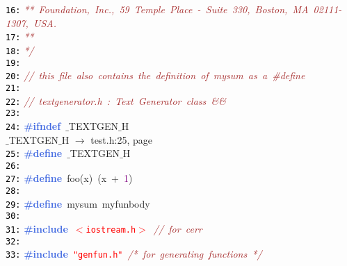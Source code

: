 \documentclass{article}
\begin{document}
\mbox{}\texttt{\textcolor{Black}{16:}} \textit{\textcolor{Brown}{**\ Foundation,\ Inc.,\ 59\ Temple\ Place\ -\ Suite\ 330,\ Boston,\ MA\ 02111-1307,\ USA.}} \\
\mbox{}\texttt{\textcolor{Black}{17:}} \textit{\textcolor{Brown}{**\ \ }} \\
\mbox{}\texttt{\textcolor{Black}{18:}} \textit{\textcolor{Brown}{*/}} \\
\mbox{}\texttt{\textcolor{Black}{19:}}  \\
\mbox{}\texttt{\textcolor{Black}{20:}} \textit{\textcolor{Brown}{//\ this\ file\ also\ contains\ the\ definition\ of\ mysum\ as\ a\ \#define}} \\
\mbox{}\texttt{\textcolor{Black}{21:}}  \\
\mbox{}\texttt{\textcolor{Black}{22:}} \textit{\textcolor{Brown}{//\ textgenerator.h\ :\ Text\ Generator\ class\ \&\&}} \\
\mbox{}\texttt{\textcolor{Black}{23:}}  \\
\mbox{}\texttt{\textcolor{Black}{24:}} \textbf{\textcolor{RoyalBlue}{\#ifndef}}\ $\_$TEXTGEN$\_$H \\
\mbox{}{\hfill $\_$TEXTGEN$\_$H $\rightarrow$ test.h:25, page~\pageref{test.h:25}} \\
\mbox{}\texttt{\textcolor{Black}{25:}} \textbf{\textcolor{RoyalBlue}{\#define}}\ \label{test.h:25}$\_$TEXTGEN$\_$H \\
\mbox{}\texttt{\textcolor{Black}{26:}}  \\
\mbox{}\texttt{\textcolor{Black}{27:}} \textbf{\textcolor{RoyalBlue}{\#define}}\ \label{test.h:27}foo\textcolor{BrickRed}{(}x\textcolor{BrickRed}{)}\ \textcolor{BrickRed}{(}x\ \textcolor{BrickRed}{+}\ \textcolor{Purple}{1}\textcolor{BrickRed}{)} \\
\mbox{}\texttt{\textcolor{Black}{28:}}  \\
\mbox{}\texttt{\textcolor{Black}{29:}} \textbf{\textcolor{RoyalBlue}{\#define}}\ \label{test.h:29}mysum\ myfunbody\  \\
\mbox{}\texttt{\textcolor{Black}{30:}}  \\
\mbox{}\texttt{\textcolor{Black}{31:}} \textbf{\textcolor{RoyalBlue}{\#include}}\ \texttt{\textcolor{Red}{$<$iostream.h$>$}}\ \textit{\textcolor{Brown}{//\ for\ cerr}} \\
\mbox{}\texttt{\textcolor{Black}{32:}}  \\
\mbox{}\texttt{\textcolor{Black}{33:}} \textbf{\textcolor{RoyalBlue}{\#include}}\ \texttt{\textcolor{Red}{"{}genfun.h"{}}}\ \textit{\textcolor{Brown}{/*\ for\ generating\ functions\ */}} \\
\end{document}

